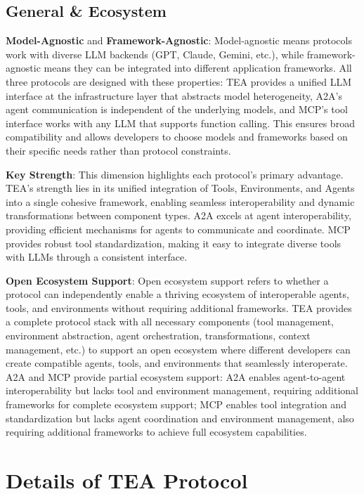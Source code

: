\documentclass[11pt]{article}
\begin{document}
\subsection{General \& Ecosystem}

\textbf{Model-Agnostic} and \textbf{Framework-Agnostic}: Model-agnostic means protocols work with diverse LLM backends (GPT, Claude, Gemini, etc.), while framework-agnostic means they can be integrated into different application frameworks. All three protocols are designed with these properties: TEA provides a unified LLM interface at the infrastructure layer that abstracts model heterogeneity, A2A's agent communication is independent of the underlying models, and MCP's tool interface works with any LLM that supports function calling. This ensures broad compatibility and allows developers to choose models and frameworks based on their specific needs rather than protocol constraints.

\textbf{Key Strength}: This dimension highlights each protocol's primary advantage. TEA's strength lies in its unified integration of Tools, Environments, and Agents into a single cohesive framework, enabling seamless interoperability and dynamic transformations between component types. A2A excels at agent interoperability, providing efficient mechanisms for agents to communicate and coordinate. MCP provides robust tool standardization, making it easy to integrate diverse tools with LLMs through a consistent interface.

\textbf{Open Ecosystem Support}: Open ecosystem support refers to whether a protocol can independently enable a thriving ecosystem of interoperable agents, tools, and environments without requiring additional frameworks. TEA provides a complete protocol stack with all necessary components (tool management, environment abstraction, agent orchestration, transformations, context management, etc.) to support an open ecosystem where different developers can create compatible agents, tools, and environments that seamlessly interoperate. A2A and MCP provide partial ecosystem support: A2A enables agent-to-agent interoperability but lacks tool and environment management, requiring additional frameworks for complete ecosystem support; MCP enables tool integration and standardization but lacks agent coordination and environment management, also requiring additional frameworks to achieve full ecosystem capabilities.

\section{Details of TEA Protocol}
\label{appx_sec:details_of_tea_protocol}
\end{document}
